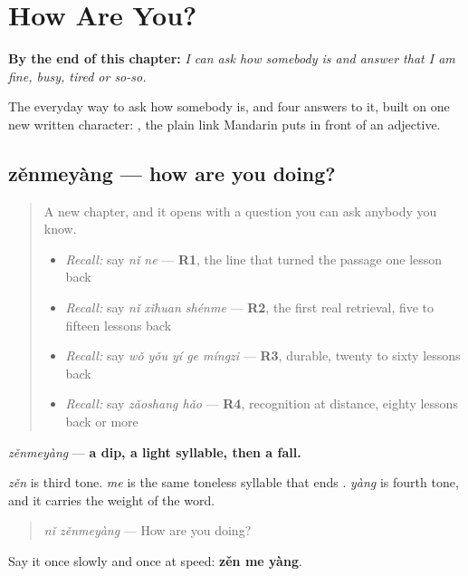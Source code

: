 
\chapter{How Are You?}
\label{ch:zh-how-are-you}

\begin{chapteropening}
\textbf{By the end of this chapter:} \emph{I can ask how somebody is and answer that I am fine, busy, tired or so-so.}

The everyday way to ask how somebody is, and four answers to it, built on one new written character: , the plain link Mandarin puts in front of an adjective.
\end{chapteropening}

\section[zěnmeyàng]{zěnmeyàng — how are you doing?}

\label{lesson:ZH-C30-zenmeyang}



\begin{quote}
A new chapter, and it opens with a question you can ask anybody you know.

\begin{itemize}
\raggedright
  \item \emph{Recall:} say \emph{nǐ ne} — \textbf{R1}, the line that turned the passage one lesson back
  \item \emph{Recall:} say \emph{nǐ xǐhuan shénme} — \textbf{R2}, the first real retrieval, five to fifteen lessons back
  \item \emph{Recall:} say \emph{wǒ yǒu yí ge míngzi} — \textbf{R3}, durable, twenty to sixty lessons back
  \item \emph{Recall:} say \emph{zǎoshang hǎo} — \textbf{R4}, recognition at distance, eighty lessons back or more
\end{itemize}
\end{quote}

\begin{sounds}
\emph{zěnmeyàng} — \textbf{a dip, a light syllable, then a fall.}

\emph{zěn} is third tone. \emph{me} is the same toneless syllable that ends . \emph{yàng} is fourth tone, and it carries the weight of the word.

\begin{quote}
\emph{nǐ zěnmeyàng} — How are you doing?
\end{quote}

Say it once slowly and once at speed: \textbf{zěn me yàng}.
\end{sounds}

